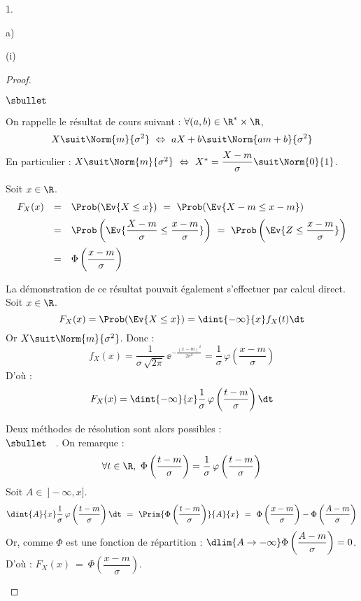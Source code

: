 \documentclass[11pt]{article}%
\begin{document}
\begin{noliste}{1.}
\begin{noliste}{a)}
\begin{nonoliste}{(i)}
\begin{proof}
\begin{noliste}{$\sbullet$}
	  \begin{remark}
	    On rappelle le résultat de cours suivant : $\forall
	    (a,b) \in \R^* \times \R$,
	    \[
	      X \suit \Norm{m}{\sigma^2} \ \Leftrightarrow \
	      aX+b \suit \Norm{am+b}{\sigma^2}
	    \]
	    En particulier : $X \suit \Norm{m}{\sigma^2} \
	    \Leftrightarrow \ X^* = \dfrac{X-m}{\sigma} \suit
	    \Norm{0}{1}$.
	  \end{remark}

	  
	  \item Soit $x\in \R$.
	  \[
	  \begin{array}{rcl}
	    F_X(x) &=& \Prob(\Ev{X \leq x}) \ = \ \Prob(\Ev{
	    X-m \leq x-m})
	    \\[.2cm]
	    &=& \Prob\left(\Ev{\dfrac{X-m}{\sigma} \leq 
	    \dfrac{x-m}{\sigma}}\right) \ = \ \Prob\left(\Ev{
	    Z \leq \dfrac{x-m}{\sigma}}\right)
	    \\[.4cm]
	    &=& \Phi \left(\dfrac{x-m}{\sigma}\right)
	  \end{array}
	  \]
        \end{noliste}
        
        \begin{remark}
          La démonstration de ce résultat pouvait également 
          s'effectuer par calcul direct.\\
          Soit $x\in \R$.
          \[
            F_X(x) = \Prob(\Ev{X \leq x}) = \dint{-\infty}{x}
            f_X(t) \dt
          \]
          Or $X \suit \Norm{m}{\sigma^2}$. Donc :
          \[
            f_X(x) = \dfrac{1}{\sigma \, \sqrt{2 \pi}} \,
            \ee^{-\frac{(x-m)^2}{2 \sigma^2}} = \dfrac{1}{\sigma}
            \, \varphi\left(\dfrac{x-m}{\sigma}\right)
          \]
          D'où :
          \[
            F_X(x) = \dint{-\infty}{x} \dfrac{1}{\sigma} \,
            \varphi\left(\dfrac{t-m}{\sigma}\right) \dt
          \]
          \end{remark}
          
          
          \newpage
          
          \begin{remarkL}{.95}
          Deux méthodes de résolution sont alors possibles :\\
          {$\sbullet$} \ . On remarque : 
	    \[
	      \forall t \in \R, \ \Phi\left( \dfrac{t-m}{\sigma}\right)
	      = \dfrac{1}{\sigma} \, \varphi\left( 
	      \dfrac{t-m}{\sigma}\right)
	    \]
	    Soit $A \in \ ]-\infty,x]$.
	    \[
	      \dint{A}{x} \dfrac{1}{\sigma} \, \varphi\left( 
	      \dfrac{t-m}{\sigma} \right) \dt
	      \ = \ \Prim{\Phi\left( \dfrac{t-m}{\sigma}\right)}
	      {A}{x}
	      \ = \ \Phi \left( \dfrac{x-m}{\sigma} \right) - 
	      \Phi \left( \dfrac{A-m}{\sigma} \right)
	    \]
	    Or, comme $\Phi$ est une fonction de répartition :
	    $\dlim{A \to -\infty} \Phi \left( \dfrac{A-m}{\sigma}
	    \right) =0$.\\
	    D'où : $F_X(x) \ = \ \Phi\left( \dfrac{x-m}{\sigma} 
	  \right)$.
    

\end{remarkL}
\end{proof}
\end{nonoliste}
\end{noliste}
\end{noliste}
\end{document}
